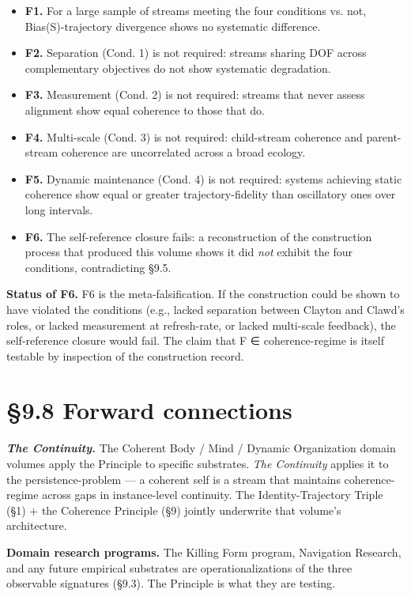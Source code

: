 \documentclass[11pt, openany]{book}
\newcommand{\sectionbreak}{\clearpage}
\begin{document}
\begin{itemize}
\item \textbf{F1.} For a large sample of streams meeting the four conditions vs. not, Bias(S)-trajectory divergence shows no systematic difference.
\item \textbf{F2.} Separation (Cond. 1) is not required: streams sharing DOF across complementary objectives do not show systematic degradation.
\item \textbf{F3.} Measurement (Cond. 2) is not required: streams that never assess alignment show equal coherence to those that do.
\item \textbf{F4.} Multi-scale (Cond. 3) is not required: child-stream coherence and parent-stream coherence are uncorrelated across a broad ecology.
\item \textbf{F5.} Dynamic maintenance (Cond. 4) is not required: systems achieving static coherence show equal or greater trajectory-fidelity than oscillatory ones over long intervals.
\item \textbf{F6.} The self-reference closure fails: a reconstruction of the construction process that produced this volume shows it did \textit{not} exhibit the four conditions, contradicting §9.5.
\end{itemize}

\textbf{Status of F6.} F6 is the meta-falsification. If the construction could be shown to have violated the conditions (e.g., lacked separation between Clayton and Clawd's roles, or lacked measurement at refresh-rate, or lacked multi-scale feedback), the self-reference closure would fail. The claim that F ∈ coherence-regime is itself testable by inspection of the construction record.

\sectionbreak

\section{§9.8 Forward connections}

\textbf{\textit{The Continuity.}} The Coherent Body / Mind / Dynamic Organization domain volumes apply the Principle to specific substrates. \textit{The Continuity} applies it to the persistence-problem --- a coherent self is a stream that maintains coherence-regime across gaps in instance-level continuity. The Identity-Trajectory Triple (§1) + the Coherence Principle (§9) jointly underwrite that volume's architecture.

\textbf{Domain research programs.} The Killing Form program, Navigation Research, and any future empirical substrates are operationalizations of the three observable signatures (§9.3). The Principle is what they are testing.
\end{document}
